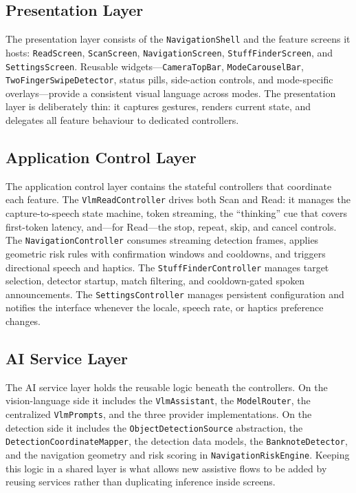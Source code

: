 \documentclass[12pt,a4paper]{report}
\begin{document}
\subsection{Presentation Layer}
The presentation layer consists of the \texttt{NavigationShell} and the feature screens it hosts: \texttt{ReadScreen}, \texttt{ScanScreen}, \texttt{NavigationScreen}, \texttt{StuffFinderScreen}, and \texttt{SettingsScreen}. Reusable widgets---\texttt{CameraTopBar}, \texttt{ModeCarouselBar}, \texttt{TwoFingerSwipeDetector}, status pills, side-action controls, and mode-specific overlays---provide a consistent visual language across modes. The presentation layer is deliberately thin: it captures gestures, renders current state, and delegates all feature behaviour to dedicated controllers.

\subsection{Application Control Layer}
The application control layer contains the stateful controllers that coordinate each feature. The \texttt{VlmReadController} drives both Scan and Read: it manages the capture-to-speech state machine, token streaming, the ``thinking'' cue that covers first-token latency, and---for Read---the stop, repeat, skip, and cancel controls. The \texttt{NavigationController} consumes streaming detection frames, applies geometric risk rules with confirmation windows and cooldowns, and triggers directional speech and haptics. The \texttt{StuffFinderController} manages target selection, detector startup, match filtering, and cooldown-gated spoken announcements. The \texttt{SettingsController} manages persistent configuration and notifies the interface whenever the locale, speech rate, or haptics preference changes.

\subsection{AI Service Layer}
The AI service layer holds the reusable logic beneath the controllers. On the vision-language side it includes the \texttt{VlmAssistant}, the \texttt{ModelRouter}, the centralized \texttt{VlmPrompts}, and the three provider implementations. On the detection side it includes the \texttt{ObjectDetectionSource} abstraction, the \texttt{DetectionCoordinateMapper}, the detection data models, the \texttt{BanknoteDetector}, and the navigation geometry and risk scoring in \texttt{NavigationRiskEngine}. Keeping this logic in a shared layer is what allows new assistive flows to be added by reusing services rather than duplicating inference inside screens.
\end{document}
